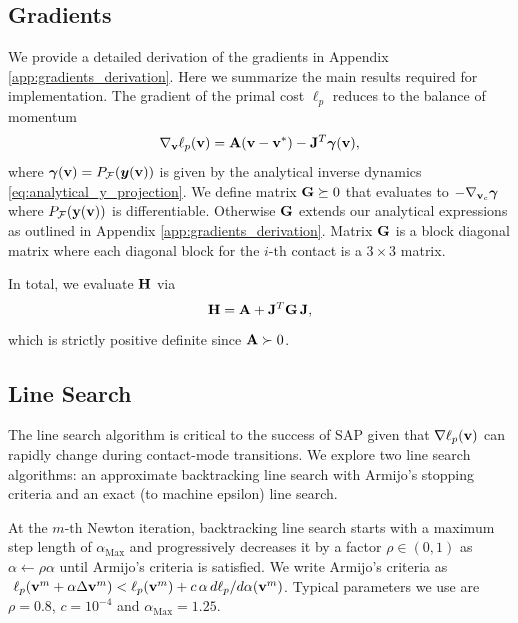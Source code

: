 \subsection{Gradients}
\label{sec:gradients}

We provide a detailed derivation of the gradients in Appendix
\ref{app:gradients_derivation}. Here we summarize the main results required for
implementation. The gradient of the primal cost $\ell_p$ reduces to the balance
of momentum
\begin{equation*}
	\nabla_{\mathbf{v}}\ell_p({\mathbf{v}}) = {\mathbf{A}}({\mathbf{v}}-{\mathbf{v}}^*) - {\mathbf{J}}^T{\bm\gamma}({\mathbf{v}}),
\end{equation*}
where ${\bm\gamma}({\mathbf{v}})=P_\mathcal{F}({\bm{y}}({\mathbf{v}}))$ is given by the analytical
inverse dynamics \eqref{eq:analytical_y_projection}. We define matrix
${\mathbf{G}}\succeq 0$ that evaluates to $-\nabla_{{\mathbf{v}}_c}{\bm\gamma}$ where
$P_\mathcal{F}({\mathbf{y}}({\mathbf{v}}))$ is differentiable. Otherwise ${\mathbf{G}}$ extends
our analytical expressions as outlined in Appendix
\ref{app:gradients_derivation}. Matrix ${\mathbf{G}}$ is a block diagonal matrix where
each diagonal block for the $i\text{-th}$ contact is a $3\times 3$ matrix.

In total, we evaluate ${\mathbf{H}}$ via
\begin{equation*}
	{\mathbf{H}} = {\mathbf{A}} + {\mathbf{J}}^T{\mathbf{G}}\,{\mathbf{J}},
\end{equation*}
which is strictly positive definite since ${\mathbf{A}}\succ 0$.

\subsection{Line Search}

The line search algorithm is critical to the success of SAP given that $\nabla
\ell_p({\mathbf{v}})$ can rapidly change during contact-mode transitions.  We explore
two line search algorithms: an approximate backtracking line search with
Armijo's stopping criteria and an exact (to machine epsilon) line search.

At the $m\text{-th}$ Newton iteration, backtracking line search starts with a
maximum step length of $\alpha_\text{Max}$ and progressively decreases it by a
factor $\rho \in (0, 1)$ as $\alpha\gets\rho\alpha$ until Armijo's criteria
\cite[\S 3.1]{bib:nocedal2006numerical} is satisfied. We write Armijo's criteria
as $~\ell_p({\mathbf{v}}^m + \alpha \Delta{\mathbf{v}}^{m}) < \ell_p({\mathbf{v}}^m) +
c\,\alpha\,d\ell_p/d\alpha({\mathbf{v}}^m)$. Typical parameters we use are $\rho=0.8$,
$c=10^{-4}$ and $\alpha_\text{Max}=1.25$.

